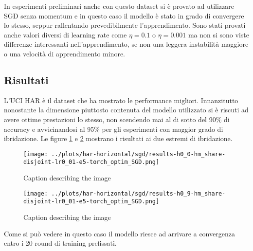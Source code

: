 In esperimenti preliminari anche con questo dataset si è provato ad 
utilizzare SGD senza momentum e in questo caso il modello è stato in 
grado di convergere lo stesso, seppur rallentando prevedibilmente 
l'apprendimento. Sono stati provati anche valori diversi di learning 
rate come \(\eta = 0.1\) o \(\eta = 0.001\) ma non si sono viste 
differenze interessanti nell'apprendimento, se non una leggera 
instabilità maggiore o una velocità di apprendimento minore.


\subsection{Risultati}
L'UCI HAR è il dataset che ha mostrato le performance migliori.
Innanzitutto nonostante la dimensione piuttosto contenuta del modello
utilizzato si è riscuti ad avere ottime prestazioni lo stesso, non 
scendendo mai al di sotto del 90\% di accuracy e avvicinandosi al 
95\% per gli esperimenti con maggior grado di ibridazione. Le 
figure \ref{fig:hars0sgd} e \ref{fig:hars9sgd} mostrano i risultati 
ai due estremi di ibridazione.
\begin{figure}[htbp]  %
    \centering
    \texttt{[image: ../plots/har-horizontal/sgd/results-h0\_0-hm\_share-disjoint-lr0\_01-e5-torch\_optim\_SGD.png]}
    \caption{Caption describing the image}
    \label{fig:hars0sgd}
\end{figure}
\begin{figure}[htbp]  %
    \centering
    \texttt{[image: ../plots/har-horizontal/sgd/results-h0\_9-hm\_share-disjoint-lr0\_01-e5-torch\_optim\_SGD.png]}
    \caption{Caption describing the image}
    \label{fig:hars9sgd}
\end{figure}

Come si può vedere in questo caso il modello riesce ad arrivare a 
convergenza entro i 20 round di training prefissati.

